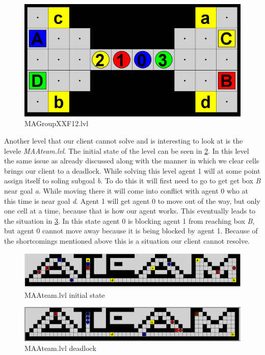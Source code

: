 \documentclass[letterpaper]{article}
\begin{document}
\begin{figure}[!htb]
	\centering
	\includegraphics[scale=0.3]{MAGroupXXF12.PNG}
	\caption{MAGroupXXF12.lvl}
	\label{fig:magroupxx}
\end{figure}


Another level that our client cannot solve and is interesting to look at is the levele \textit{MAAteam.lvl}. The initial state of the level can be seen in \ref{fig:maateam1}. In this level the same issue as already discussed along with the manner in which we clear cells brings our client to a deadlock. While solving this level agent 1 will at some point assign itself to soling subgoal \textit{b}. To do this it will first need to go to get get box \textit{B} near goal \textit{a}. While moving there it will come into conflict with agent 0 who at this time is near goal \textit{d}. Agent 1 will get agent 0 to move out of the way, but only one cell at a time, because that is how our agent works. This eventually leads to the situation in \ref{fig:maateam2}. In this state agent 0 is blocking agent 1 from reaching box \textit{B}, but agent 0 cannot move away because it is being blocked by agent 1. Because of the shortcomings mentioned above this is a situation our client cannot resolve.

\begin{figure}[!htb]
	\centering
	\includegraphics[scale=0.3]{MAAteam1.PNG}
	\caption{MAAteam.lvl initial state}
	\label{fig:maateam1}
\end{figure}

\begin{figure}[!htb]
	\centering
	\includegraphics[scale=0.3]{MAAteam2.PNG}
	\caption{MAAteam.lvl deadlock}
	\label{fig:maateam2}
\end{figure}
\end{document}
